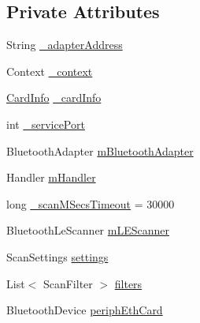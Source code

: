 \subsection*{Private Attributes}
\begin{DoxyCompactItemize}
\item 
String \mbox{\hyperlink{classcom_1_1ethernom_1_1android_1_1etherapi_1_1link_layer_1_1_ether_b_t_adapter_a8b6aecd270762cbfcedb491484af469a}{\+\_\+adapter\+Address}}
\item 
Context \mbox{\hyperlink{classcom_1_1ethernom_1_1android_1_1etherapi_1_1link_layer_1_1_ether_b_t_adapter_a4eec54dc59cbafb592e3cba87ba77fdb}{\+\_\+context}}
\item 
\mbox{\hyperlink{classcom_1_1ethernom_1_1android_1_1etherapi_1_1_card_info}{Card\+Info}} \mbox{\hyperlink{classcom_1_1ethernom_1_1android_1_1etherapi_1_1link_layer_1_1_ether_b_t_adapter_afd31ea7a4f18d8389f43fc255458188d}{\+\_\+card\+Info}}
\item 
int \mbox{\hyperlink{classcom_1_1ethernom_1_1android_1_1etherapi_1_1link_layer_1_1_ether_b_t_adapter_a8d77423d04fd47630ca1c2e95b7da95e}{\+\_\+service\+Port}}
\item 
Bluetooth\+Adapter \mbox{\hyperlink{classcom_1_1ethernom_1_1android_1_1etherapi_1_1link_layer_1_1_ether_b_t_adapter_aa1ae884af97ed63c824075f256e7d952}{m\+Bluetooth\+Adapter}}
\item 
Handler \mbox{\hyperlink{classcom_1_1ethernom_1_1android_1_1etherapi_1_1link_layer_1_1_ether_b_t_adapter_a57060d36f1ded886118905a61ba65c0a}{m\+Handler}}
\item 
long \mbox{\hyperlink{classcom_1_1ethernom_1_1android_1_1etherapi_1_1link_layer_1_1_ether_b_t_adapter_adc463e0641b6c8439e3fde9691f01482}{\+\_\+scan\+M\+Secs\+Timeout}} = 30000
\item 
Bluetooth\+Le\+Scanner \mbox{\hyperlink{classcom_1_1ethernom_1_1android_1_1etherapi_1_1link_layer_1_1_ether_b_t_adapter_a694c328c7d2eb05e971e94ff14cb5022}{m\+L\+E\+Scanner}}
\item 
Scan\+Settings \mbox{\hyperlink{classcom_1_1ethernom_1_1android_1_1etherapi_1_1link_layer_1_1_ether_b_t_adapter_ad0ed7864e2b5f3b374406d8011df287e}{settings}}
\item 
List$<$ Scan\+Filter $>$ \mbox{\hyperlink{classcom_1_1ethernom_1_1android_1_1etherapi_1_1link_layer_1_1_ether_b_t_adapter_a19a2aab9270f0a9c162c27c59c5c4f81}{filters}}
\item 
Bluetooth\+Device \mbox{\hyperlink{classcom_1_1ethernom_1_1android_1_1etherapi_1_1link_layer_1_1_ether_b_t_adapter_a2cb82bab4a5d0ae8e01619518115bc31}{periph\+Eth\+Card}}

\end{DoxyCompactItemize}
